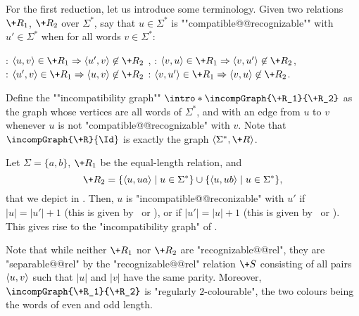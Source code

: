 \AP For the first reduction, let us introduce some terminology.
Given two relations $\+R_1$, $\+R_2$ over $\Sigma^*$, say that
$u \in \Sigma^*$ is ""compatible@@recognizable"" with
$u' \in \Sigma^*$ when for all words $v \in \Sigma^*$:
\begin{center}
    \intro*\compL: $\tup{u,v} \in \+R_1 \Rightarrow \tup{u',v} \not\in \+R_2$%
    ,\hphantom{\text{ \fancyand }}
    \intro*\compR: $\tup{v,u} \in \+R_1 \Rightarrow \tup{v,u'} \not\in \+R_2$,\\
    \intro*\compLpr: $\tup{u',v} \in \+R_1 \Rightarrow \tup{u,v} \not\in \+R_2$%
    \hphantom{,}\text{ \fancyand }
    \intro*\compRpr: $\tup{v,u'} \in \+R_1 \Rightarrow \tup{v,u} \not\in \+R_2$.
\end{center}
\AP
Define the ""incompatibility graph"" $\intro*\incompGraph{\+R_1}{\+R_2}$
as the graph whose vertices are all words of $\Sigma^*$,
and with an edge from $u$ to $v$ whenever $u$ is not "compatible@@recognizable" with $v$.
Note that $\incompGraph{\+R}{\Id}$ is exactly the graph $\tup{\Sigma^*,\+R}$.

\begin{example}%
    \AP\label{ex:equal-length-plusone}%
    Let $\Sigma = \{a,b\}$, $\+R_1$ be the equal-length relation,
    and
    \[
        \+R_2 = \{\tup{u, ua} \mid u \in \Sigma^*\} \cup \{\tup{u, ub} \mid u \in \Sigma^*\},
    \]
    that we depict in .
    Then, $u$ is "incompatible@@reconizable" with $u'$ if $|u| = |u'|+1$ (this is given by \compL~or \compR),
    or if $|u'| = |u|+1$ (this is given by \compLpr~or \compRpr).
    This gives rise to the "incompatibility graph" of
    .
    \begin{marginfigure}[-8em]%
        \centering
        \begin{tikzpicture}
            
        \end{tikzpicture}
        \caption{\AP\label{fig:equal-length-plusone-relation}%
            The relation $\+R_2$ of ,
            restricted to words of length at most 2.
        }
    \end{marginfigure}%
    \begin{marginfigure}%
        \centering
        \begin{tikzpicture}
            
        \end{tikzpicture}
        \caption{\AP\label{fig:equal-length-plusone-incompatibility}%
            "Incompatibility graph" $\incompGraph{\+R_1}{\+R_2}$ and its "regular $2$-colouring".%
        }
    \end{marginfigure}%

    Note that while neither $\+R_1$ nor $\+R_2$ are "recognizable@@rel",
    they are "separable@@rel" by the "recognizable@@rel" relation
    $\+S$ consisting of all pairs $\tup{u,v}$ such that $|u|$ and $|v|$ have the same parity.
    Moreover, $\incompGraph{\+R_1}{\+R_2}$ is "regularly $2$-colourable", the two colours being
    the words of even and odd length.
\end{example}

